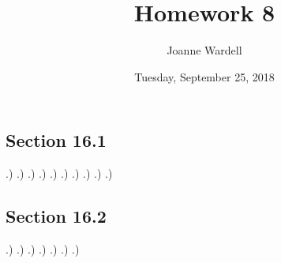 \documentclass[12pt]{article}
\title{\vspace{-2.0cm}Homework 8}
\author{Joanne Wardell}
\date{Tuesday, September 25, 2018}
\begin{document}
\maketitle
\subsection*{Section 16.1}
.) 
.)
.)
.)
.)
.)
.) 
.)
.)
.)



\subsection*{Section 16.2}
.) 
.)
.)
.)
.)
.)
.)
\end{document}

